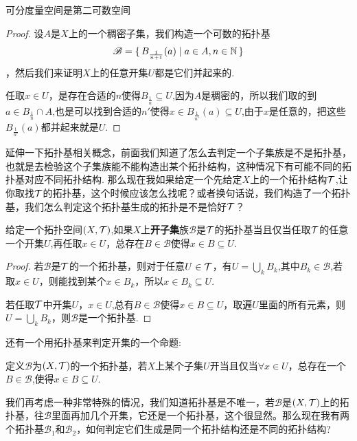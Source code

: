 \begin{proposition}
可分度量空间是第二可数空间
\end{proposition}

\begin{proof}
设$A$是$X$上的一个稠密子集，我们构造一个可数的拓扑基\[\mathscr{B}=\{\,B_{\frac{1}{n+1}}(a)\mid a \in A,n \in \mathbb{N}\,\}\]，然后我们来证明$X$上的任意开集$U$都是它们并起来的.

任取$x \in U$，是存在合适的$n$使得$B_{\frac{1}{n}} \subseteq U$,因为$A$是稠密的，所以我们取的到$a \in B_{\frac{1}{n}} \cap A$,也是可以找到合适的$n'$使得$x \in B_{\frac{1}{n'}}(a) \subseteq U$,由于$x$是任意的，把这些$B_{\frac{1}{n'}}(a)$都并起来就是$U$.
\end{proof}

延伸一下拓扑基相关概念，前面我们知道了怎么去判定一个子集族是不是拓扑基，也就是去检验这个子集族能不能构造出某个拓扑结构，这种情况下有可能不同的拓扑基对应不同拓扑结构. 那么现在我如果给定一个先给定$X$上的一个拓扑结构$\mathcal{T}$,让你取找$\mathcal{T}$的拓扑基，这个时候应该怎么找呢？或者换句话说，我们构造了一个拓扑基，我们怎么判定这个拓扑基生成的拓扑是不是恰好$\mathcal{T}$？

\begin{proposition}
给定一个拓扑空间$(X,\mathcal{T})$,如果$X$上\textbf{开子集}族$\mathscr{B}$是$\mathcal{T}$的拓扑基当且仅当任取$\mathcal{T}$的任意一个开集$U$,再任取$x \in U$，总存在$B \in \mathscr{B}$使得$x \in B \subseteq U$.
\end{proposition}

\begin{proof}
若$\mathscr{B}$是$\mathcal{T}$的一个拓扑基，则对于任意$U \in \mathcal{T}$，有$U = \bigcup\limits_k B_k$,其中$B_k \in \mathscr{B}$,若取$x \in U$，则能找到某个$x \in B_k$，所以$x \in B_k \subseteq U$.

若任取$\mathcal{T}$中开集$U$，$x \in U$,总有$B \in \mathscr{B}$使得$x \in B \subseteq U$，取遍$U$里面的所有元素，则$U = \bigcup\limits_k B_k$，则$\mathscr{B}$是一个拓扑基.
\end{proof}

还有一个用拓扑基来判定开集的一个命题:

\begin{proposition}
定义$\mathscr{B}$为$(X,\mathcal{T})$的一个拓扑基，若$X$上某个子集$U$开当且仅当$\forall x \in U$，总存在一个$B \in \mathscr{B}$,使得$x \in B \subseteq U$.
\end{proposition}

我们再考虑一种非常特殊的情况，我们知道拓扑基是不唯一，若$\mathscr{B}$是$(X,\mathcal{T})$上的拓扑基，往$\mathscr{B}$里面再加几个开集，它还是一个拓扑基，这个很显然。那么现在我有两个拓扑基$\mathscr{B}_1$和$\mathscr{B}_2$，如何判定它们生成是同一个拓扑结构还是不同的拓扑结构?

